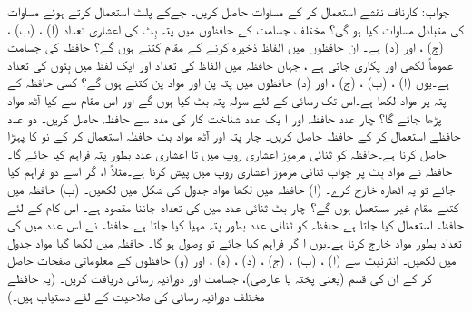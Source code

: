  جواب: 
 کارناف نقشے  استعمال  کر کے  مساوات  حاصل کریں۔
جےکے پلٹ استعمال کرتے ہوئے  مساوات   کی متبادل مساوات   کیا ہو گی؟
  مختلف جسامت کے حافظوں میں پتہ بِٹ  کی  اعشاری تعداد  (ا) ، (ب) ، (ج) ، اور  (د)  ہے۔  ان حافظوں میں الفاظ ذخیرہ کرنے کے  مقام کتنے  ہوں گے؟
 حافظہ کی  جسامت  عموماً  لکھی اور پکاری جاتی ہے ، جہاں   حافظہ میں الفاظ کی تعداد اور  ایک لفظ میں بِٹوں کی تعداد  ہے۔یوں  (ا) ،  (ب)   ، (ج)  ، اور (د)     حافظوں میں پتہ پن  اور  مواد پن کتنے  ہوں گے؟
 کسی حافظہ کے   پتہ پر  مواد لکھا ہے۔اس تک رسائی کے لئے سولہ پتہ بٹ کیا ہوں گے اور اس  مقام سے کیا  آٹھ مواد  پڑھا جائے گا؟
 چار عدد  حافظہ  اور ا یک عدد  شناخت کار کی مدد سے  حافظہ حاصل کریں۔
 دو عدد  حافظے  استعمال  کر کے  حافظہ حاصل کریں۔
 چار پتہ  اور آٹھ مواد بٹ حافظہ استعمال کر کے  نو کا  پہاڑا حاصل کرنا ہے۔حافظہ کو  ثنائی مرموز اعشاری  روپ میں  تا  اعشاری عدد بطور پتہ فراہم کیا جائے گا۔حافظہ نے مواد  بِٹ پر جواب ثنائی  مرموز اعشاری  روپ میں پیش کرنا ہے۔مثلاً ا، گر اسے دو  فراہم کیا جائے تو یہ اٹھارہ   خارج کرے۔ (ا) حافظہ میں لکھا مواد جدول کی شکل میں لکھیں۔ (ب) حافظہ میں کتنے مقام غیر مستعمل ہوں گے؟ 
 چار بٹ ثنائی عدد  میں   کی تعداد جاننا مقصود ہے۔ اس کام کے لئے  حافظہ استعمال کیا جاتا ہے۔حافظہ کو ثنائی عدد بطور پتہ مہیا کیا جاتا ہے۔حافظہ نے  اس عدد میں   کی تعداد بطور مواد خارج کرنا ہے۔یوں ا گر    فراہم کیا جائے تو    وصول ہو گا۔ حافظہ میں لکھا گیا مواد جدول میں لکھیں۔
 انٹرنیٹ سے   (ا) ، (ب) ،  (ج) ،  (د)  ، (ہ)  ، اور  (و)    حافظوں  کے  معلوماتی صفحات  حاصل کر کے ان کی قسم (یعنی پختہ یا عارضی)، جسامت اور دورانیہ رسائی دریافت کریں۔ (یہ حافظے مختلف دورانیہ رسائی کی صلاحیت کے لئے دستیاب ہیں۔)
